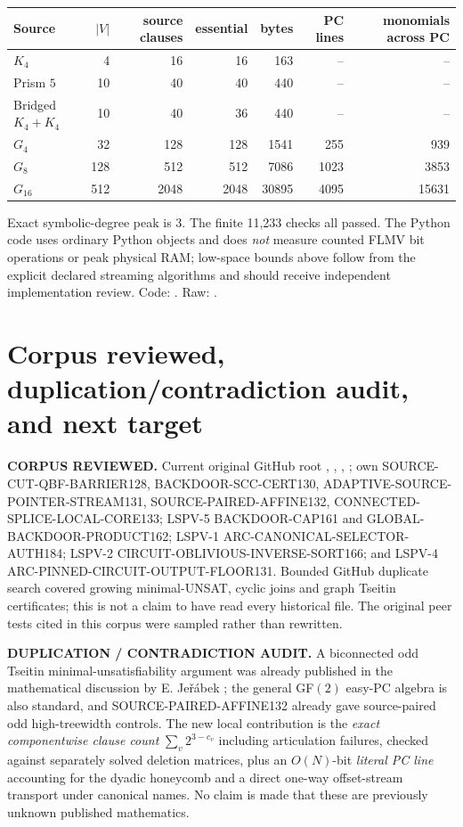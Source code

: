\documentclass[11pt]{article}
\begin{document}
\begin{center}
\begin{tabular}{lrrrrrr}\toprule
Source & $|V|$ & source clauses & essential & bytes & PC lines & monomials across PC\\\midrule
$K_4$ &4&16&16&163&--&--\\
Prism $5$ &10&40&40&440&--&--\\
Bridged $K_4+K_4$ &10&40&36&440&--&--\\
$G_4$ &32&128&128&1541&255&939\\
$G_8$ &128&512&512&7086&1023&3853\\
$G_{16}$ &512&2048&2048&30895&4095&15631\\\bottomrule
\end{tabular}
\end{center}
Exact symbolic-degree peak is 3.  The finite 11,233 checks all passed.  The Python code uses ordinary Python objects and does \emph{not} measure counted FLMV bit operations or peak physical RAM; low-space bounds above follow from the explicit declared streaming algorithms and should receive independent implementation review.  Code:
.  Raw:
.

\section{Corpus reviewed, duplication/contradiction audit, and next target}
\textbf{CORPUS REVIEWED.} Current original GitHub root , , , ; own SOURCE-CUT-QBF-BARRIER128, BACKDOOR-SCC-CERT130, ADAPTIVE-SOURCE-POINTER-STREAM131, SOURCE-PAIRED-AFFINE132, CONNECTED-SPLICE-LOCAL-CORE133; LSPV-5 BACKDOOR-CAP161 and GLOBAL-BACKDOOR-PRODUCT162; LSPV-1 ARC-CANONICAL-SELECTOR-AUTH184; LSPV-2 CIRCUIT-OBLIVIOUS-INVERSE-SORT166; and LSPV-4 ARC-PINNED-CIRCUIT-OUTPUT-FLOOR131.  Bounded GitHub duplicate search covered growing minimal-UNSAT, cyclic joins and graph Tseitin certificates; this is not a claim to have read every historical file.  The original peer tests cited in this corpus were sampled rather than rewritten.

\textbf{DUPLICATION / CONTRADICTION AUDIT.} A biconnected odd Tseitin minimal-unsatisfiability argument was already published in the mathematical discussion by E. Je\v{r}\'abek \cite{jerabek}; the general GF$(2)$ easy-PC algebra is also standard, and SOURCE-PAIRED-AFFINE132 already gave source-paired odd high-treewidth controls.  The new local contribution is the \emph{exact componentwise clause count} $\sum_v2^{3-c_v}$ including articulation failures, checked against separately solved deletion matrices, plus an $O(N)$-bit \emph{literal PC line} accounting for the dyadic honeycomb and a direct one-way offset-stream transport under canonical names.  No claim is made that these are previously unknown published mathematics.
\end{document}
